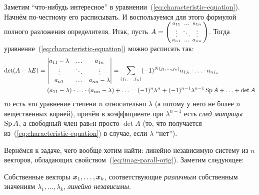 \documentclass[a4paper,12pt]{article}
\begin{document}
  Заметим ``что-нибудь интересное'' в уравнении~(\ref{eq:characteristic-equation}).
  Начнём по-честному его расписывать.
  И воспользуемся для этого формулой полного разложения определителя.
  Итак, пусть $A \hm= \left(\begin{smallmatrix} a_{11} & \ldots & a_{1n} \\ \vdots & \ddots & \vdots \\ a_{n1} & \ldots & a_{nn}\end{smallmatrix}\right)$.
  Тогда уравнение~(\ref{eq:characteristic-equation}) можно расписать так:
  \begin{equation}
  \begin{split}
    \det(A - \lambda E) &= \begin{vmatrix}
      a_{11} - \lambda & \ldots & a_{1n}\\
      \vdots           & \ddots & \vdots\\
      a_{n1}           & \ldots & a_{nn} - \lambda
    \end{vmatrix}
    = \sum_{(j_1, \ldots, j_n)} (-1)^{N(j_1, \ldots, j_n)} a_{1j_1} \cdot \ldots \cdot a_{nj_n}\\
    &= (a_{11} - \lambda) \cdot \ldots \cdot (a_{nn} - \lambda) + \ldots
    = (-1)^n \lambda^n + (-1)^{n-1} \lambda^{n-1} \operatorname{Sp} A + \ldots + \det A
  \end{split}
  \end{equation}
  то есть это уравнение степени $n$ относительно $\lambda$ (а потому у него не более $n$ вещественных корней), причём в коэффициенте при $\lambda^{n-1}$ есть \emph{след матрицы $\operatorname{Sp} A$}, а свободный член равeн просто $\det A$ (то, что получается из~(\ref{eq:characteristic-equation}) в случае, если $\lambda$ ``нет'').
  
  Вернёмся к задаче, чего вообще хотим найти: линейно независимую систему из $n$ векторов, обладающих свойством~(\ref{eq:imag-parall-orig}).
  Заметим следующее:
  
  \begin{proposition}\label{theo:eigenvectors-independent}
    Собственные векторы $\boldsymbol x_1, \ldots, \boldsymbol x_k$, соответствующие \emph{различным} собственным значениям $\lambda_1, \ldots, \lambda_k$, \emph{линейно независимы}.
  \end{proposition}
  
\end{document}
